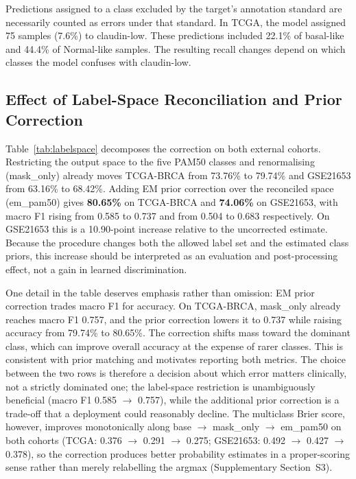 \documentclass[10pt,journal,compsoc,twocolumn]{IEEEtran}
\begin{document}
Predictions assigned to a class excluded by the target's annotation standard are necessarily counted as errors under that standard. In TCGA, the model assigned 75 samples (7.6\%) to claudin-low. These predictions included 22.1\% of basal-like and 44.4\% of Normal-like samples. The resulting recall changes depend on which classes the model confuses with claudin-low.

\subsection{Effect of Label-Space Reconciliation and Prior Correction}

Table~\ref{tab:labelspace} decomposes the correction on both external cohorts. Restricting the output space to the five PAM50 classes and renormalising (mask\_only) already moves TCGA-BRCA from 73.76\% to 79.74\% and GSE21653 from 63.16\% to 68.42\%. Adding EM prior correction over the reconciled space (em\_pam50) gives \textbf{80.65\%} on TCGA-BRCA and \textbf{74.06\%} on GSE21653, with macro F1 rising from 0.585 to 0.737 and from 0.504 to 0.683 respectively. On GSE21653 this is a 10.90-point increase relative to the uncorrected estimate. Because the procedure changes both the allowed label set and the estimated class priors, this increase should be interpreted as an evaluation and post-processing effect, not a gain in learned discrimination.

One detail in the table deserves emphasis rather than omission: EM prior correction trades macro F1 for accuracy. On TCGA-BRCA, mask\_only already reaches macro F1 0.757, and the prior correction lowers it to 0.737 while raising accuracy from 79.74\% to 80.65\%. The correction shifts mass toward the dominant class, which can improve overall accuracy at the expense of rarer classes. This is consistent with prior matching and motivates reporting both metrics. The choice between the two rows is therefore a decision about which error matters clinically, not a strictly dominated one; the label-space restriction is unambiguously beneficial (macro F1 0.585 $\rightarrow$ 0.757), while the additional prior correction is a trade-off that a deployment could reasonably decline. The multiclass Brier score, however, improves monotonically along base $\rightarrow$ mask\_only $\rightarrow$ em\_pam50 on both cohorts (TCGA: 0.376 $\rightarrow$ 0.291 $\rightarrow$ 0.275; GSE21653: 0.492 $\rightarrow$ 0.427 $\rightarrow$ 0.378), so the correction produces better probability estimates in a proper-scoring sense rather than merely relabelling the argmax (Supplementary Section~S3).
\end{document}

